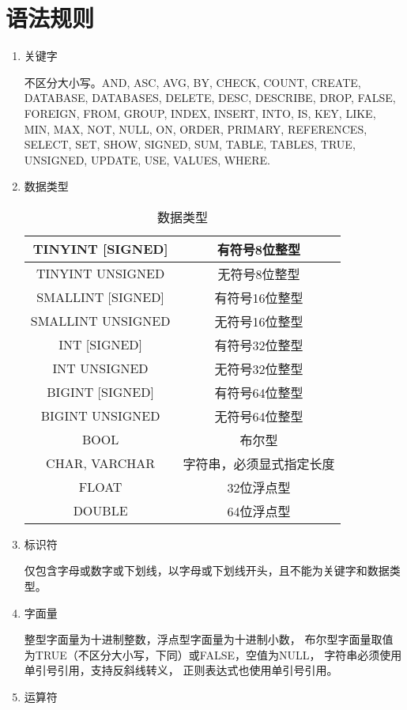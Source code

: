 \section{语法规则}
    \begin{enumerate}
    \item
    关键字

    不区分大小写。AND, ASC, AVG, BY, CHECK, COUNT, CREATE, 
    DATABASE, DATABASES, DELETE, DESC, DESCRIBE, DROP, 
    FALSE, FOREIGN, FROM, GROUP, INDEX, INSERT, INTO,
    IS, KEY, LIKE, MIN, MAX, NOT, NULL, ON, ORDER, 
    PRIMARY, REFERENCES, SELECT, SET, SHOW, SIGNED, SUM, 
    TABLE, TABLES, TRUE, UNSIGNED, UPDATE, USE, VALUES, WHERE.
    \item
    数据类型
    \begin{table}[!hbp]
        \centering
        \caption{数据类型}
        \begin{tabular}{|c|c|}
        \hline
        TINYINT [SIGNED] & 有符号8位整型 \\
        \hline
        TINYINT UNSIGNED & 无符号8位整型 \\
        \hline
        SMALLINT [SIGNED] & 有符号16位整型 \\
        \hline
        SMALLINT UNSIGNED & 无符号16位整型 \\
        \hline
        INT [SIGNED] & 有符号32位整型 \\
        \hline
        INT UNSIGNED & 无符号32位整型 \\
        \hline
        BIGINT [SIGNED] & 有符号64位整型 \\
        \hline
        BIGINT UNSIGNED & 无符号64位整型 \\
        \hline
        BOOL & 布尔型 \\
        \hline
        CHAR, VARCHAR & 字符串，必须显式指定长度 \\
        \hline
        FLOAT & 32位浮点型 \\
        \hline
        DOUBLE & 64位浮点型 \\
        \hline
        \end{tabular}
    \end{table}

    \item
    标识符

    仅包含字母或数字或下划线，以字母或下划线开头，且不能为关键字和数据类型。
    \item
    字面量

    整型字面量为十进制整数，浮点型字面量为十进制小数，%
    布尔型字面量取值为TRUE（不区分大小写，下同）或FALSE，空值为NULL，%
    字符串必须使用单引号引用，支持反斜线转义，%
    正则表达式也使用单引号引用。
    \item
    运算符


\end{enumerate}
